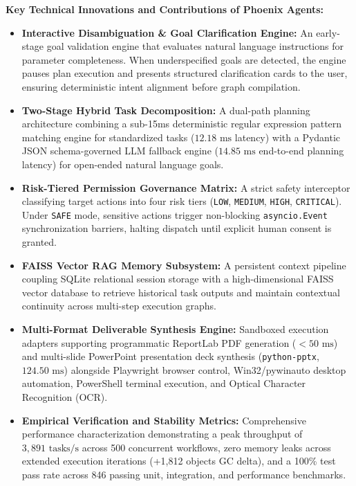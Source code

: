 \documentclass[conference]{IEEEtran}
\begin{document}
\textbf{Key Technical Innovations and Contributions of Phoenix Agents:}
\begin{itemize}
    \item \textbf{Interactive Disambiguation \& Goal Clarification Engine:} An early-stage goal validation engine that evaluates natural language instructions for parameter completeness. When underspecified goals are detected, the engine pauses plan execution and presents structured clarification cards to the user, ensuring deterministic intent alignment before graph compilation.
    \item \textbf{Two-Stage Hybrid Task Decomposition:} A dual-path planning architecture combining a sub-15ms deterministic regular expression pattern matching engine for standardized tasks ($12.18\text{ ms}$ latency) with a Pydantic JSON schema-governed LLM fallback engine ($14.85\text{ ms}$ end-to-end planning latency) for open-ended natural language goals.
    \item \textbf{Risk-Tiered Permission Governance Matrix:} A strict safety interceptor classifying target actions into four risk tiers (\texttt{LOW}, \texttt{MEDIUM}, \texttt{HIGH}, \texttt{CRITICAL}). Under \texttt{SAFE} mode, sensitive actions trigger non-blocking \texttt{asyncio.Event} synchronization barriers, halting dispatch until explicit human consent is granted.
    \item \textbf{FAISS Vector RAG Memory Subsystem:} A persistent context pipeline coupling SQLite relational session storage with a high-dimensional FAISS vector database to retrieve historical task outputs and maintain contextual continuity across multi-step execution graphs.
    \item \textbf{Multi-Format Deliverable Synthesis Engine:} Sandboxed execution adapters supporting programmatic ReportLab PDF generation ($<50\text{ ms}$) and multi-slide PowerPoint presentation deck synthesis (\texttt{python-pptx}, $124.50\text{ ms}$) alongside Playwright browser control, Win32/pywinauto desktop automation, PowerShell terminal execution, and Optical Character Recognition (OCR).
    \item \textbf{Empirical Verification and Stability Metrics:} Comprehensive performance characterization demonstrating a peak throughput of $3,891\text{ tasks/s}$ across 500 concurrent workflows, zero memory leaks across extended execution iterations (+1,812 objects GC delta), and a 100\% test pass rate across 846 passing unit, integration, and performance benchmarks.
\end{itemize}
\end{document}
